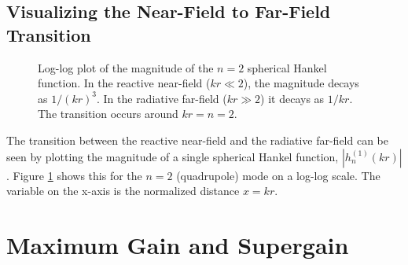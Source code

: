 \documentclass[11pt,a4paper]{article}
\begin{document}
\subsection{Visualizing the Near-Field to Far-Field Transition}

\begin{figure}[h!]
    \centering
    \caption{Log-log plot of the magnitude of the \(n=2\) spherical Hankel function. In the reactive near-field (\(kr\ll2\)), the magnitude decays as \(1/(kr)^{3}\). In the radiative far-field (\(kr\gg2\)) it decays as \(1/kr\). The transition occurs around \(kr=n=2\).}
    \label{fig:hankel_transition}
\end{figure}

The transition between the reactive near-field and the radiative far-field can be seen by plotting the magnitude of a single spherical Hankel function, \(|h_{n}^{(1)}(kr)|\). Figure \ref{fig:hankel_transition} shows this for the \(n=2\) (quadrupole) mode on a log-log scale. The variable on the x-axis is the normalized distance \(x=kr\).

\section{Maximum Gain and Supergain}
\end{document}
